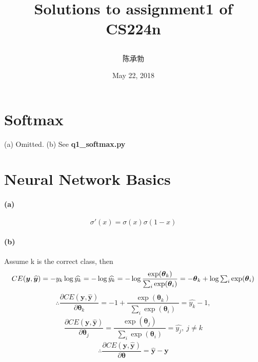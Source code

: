 \documentclass{article}
\title{
	\begin{LARGE}
		\textbf{Solutions to assignment1 of CS224n}
	\end{LARGE}
	}
\author{陈承勃}
\date{May 22, 2018}
\begin{document}
\begin{CJK}{UTF8}{gbsn}
\maketitle
\end{CJK}
\begin{spacing}{1.5} %

\section{Softmax}
(a) Omitted. 
(b) See \textbf{q1\_softmax.py}

\section{Neural Network Basics}
\paragraph{(a)} \begin{equation} \sigma'(x)=\sigma(x)\sigma(1-x) \end{equation}
\paragraph{(b)} 
Assume k is the correct class, then 
\begin{equation}
CE(\boldsymbol{y},\boldsymbol{\widehat{y}})=
-y_{k}\log \widehat{y_{k}}=-\log \widehat{y_{k}}
=-\log \frac{\exp(\boldsymbol{\theta}_k)}{\begin{matrix} \sum_{i} \exp(\boldsymbol{\theta}_i) \end{matrix}}  \\
=-\boldsymbol{\theta}_{k}+\log \begin{matrix} \sum_{i} \exp(\boldsymbol{\theta}_{i}) \end{matrix} 
\end{equation}
\begin{equation}
\boldsymbol{\therefore}
\frac{\partial CE(\boldsymbol{y},\boldsymbol{\widehat{y}})}{\partial \boldsymbol{\theta}_{k}}
=-1+\frac{\exp(\boldsymbol{\theta}_k)}{\begin{matrix} \sum_{i} \exp(\boldsymbol{\theta}_{i}) \end{matrix}}
=\widehat{y_{k}}-1, 
\end{equation}
\begin{equation}
\frac{\partial CE(\boldsymbol{y},\boldsymbol{\widehat{y}})}{\partial \boldsymbol{\theta}_{j}}
=\frac{\exp(\boldsymbol{\theta}_j)}{\begin{matrix} \sum_{i} \exp(\boldsymbol{\theta}_{i}) \end{matrix}}
=\widehat{y_{j}},\ j\neq k
\end{equation}
\begin{equation}
\boldsymbol{\therefore}
\frac{\partial CE(\boldsymbol{y},\boldsymbol{\widehat{y}})}{\partial \boldsymbol{\theta}}=\boldsymbol{\widehat{y}}-\boldsymbol{y}
\end{equation}

\end{spacing}
\end{document}
